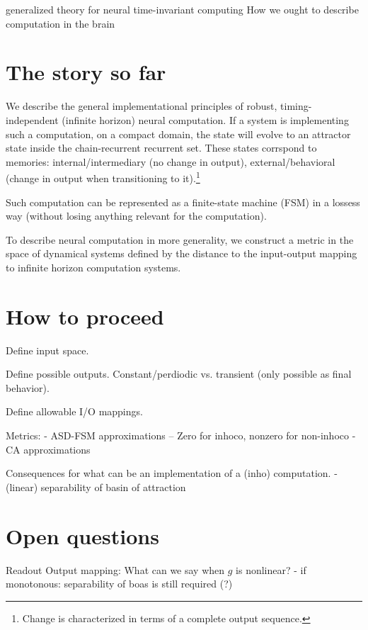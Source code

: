 \documentclass{scrartcl}
\theoremstyle{definition}
\theoremstyle{remark}
\begin{document}
generalized theory for neural time-invariant computing \citep{jaeger2021,jaeger2023theory}
How we ought to describe computation in the brain \citep{eliasmith2010describe}



\newpage
\section*{The story so far}
We describe the general implementational principles of robust, timing-independent (infinite horizon) neural computation.
If a system is implementing such a computation, on a compact domain, the state will evolve to an attractor state inside the chain-recurrent recurrent set.
These states corrspond to memories: internal/intermediary (no change in output), external/behavioral (change in output when transitioning to it).\footnote{Change is characterized in terms of a complete output sequence.}

Such computation can be represented as a finite-state machine (FSM) in a lossess way (without losing anything relevant for the computation).

To describe neural computation in more generality, we construct a metric in the space of dynamical systems defined by the distance to the input-output mapping to infinite horizon computation systems.


\section*{How to proceed}

Define input space.

Define possible outputs. Constant/perdiodic vs. transient (only possible as final behavior).

Define allowable I/O mappings.


Metrics:
- ASD-FSM approximations
-- Zero for inhoco, nonzero for non-inhoco
- CA approximations 


Consequences for what can be an implementation of a (inho) computation.
- (linear) separability of basin of attraction




\section*{Open questions}

Readout \citep{myers2022}
Output mapping: What can we say when $g$ is nonlinear?
- if monotonous: separability of boas is still required (?)
\end{document}
